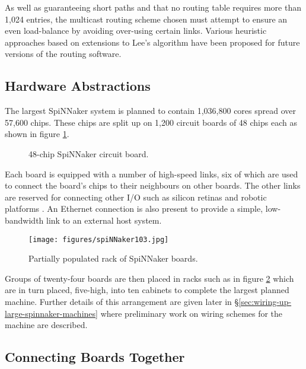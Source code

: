 				As well as guaranteeing short paths and that no routing table requires
				more than 1,024 entries, the multicast routing scheme chosen must
				attempt to ensure an even load-balance by avoiding over-using certain
				links. Various heuristic approaches based on extensions to Lee's
				algorithm have been proposed for future versions of the routing
				software\cite{davidson13}.
		
		\subsection{Hardware Abstractions}
			
			The largest SpiNNaker system is planned to contain 1,036,800 cores spread
			over 57,600 chips.  These chips are split up on 1,200 circuit boards of
			48 chips each as shown in figure \ref{fig:spinn4labelled}.
			
			\begin{figure}[p!]
				\center
				
				\caption{48-chip SpiNNaker circuit board.}
				\label{fig:spinn4labelled}
			\end{figure}
			
			Each board is equipped with a number of high-speed links, six of which are
			used to connect the board's chips to their neighbours on other boards. The
			other links are reserved for connecting other I/O such as silicon retinas
			and robotic platforms \cite{davies10}. An Ethernet connection is also
			present to provide a simple, low-bandwidth link to an external host
			system.
			
			\begin{figure}[p!]
				\center
				\texttt{[image: figures/spiNNaker103.jpg]}
				\caption{Partially populated rack of SpiNNaker boards.}
				\label{fig:spiNNaker103}
			\end{figure}
			
			Groups of twenty-four boards are then placed in racks such as in figure
			\ref{fig:spiNNaker103} which are in turn placed, five-high, into ten
			cabinets to complete the largest planned machine. Further details of this
			arrangement are given later in
			\S\ref{sec:wiring-up-large-spinnaker-machines} where preliminary work on
			wiring schemes for the machine are described.
		
		\subsection{Connecting Boards Together}
			
